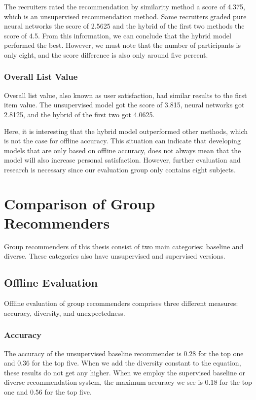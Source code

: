 The recruiters rated the recommendation by similarity method a score of 4.375, which is an unsupervised recommendation method. Same recruiters graded pure neural networks the score of 2.5625 and the hybrid of the first two methods the score of 4.5. From this information, we can conclude that the hybrid model performed the best. However, we must note that the number of participants is only eight, and the score difference is also only around five percent.

\subsubsection{Overall List Value}

Overall list value, also known as user satisfaction, had similar results to the first item value. The unsupervised model got the score of 3.815, neural networks got 2.8125, and the hybrid of the first two got 4.0625.

Here, it is interesting that the hybrid model outperformed other methods, which is not the case for offline accuracy. This situation can indicate that developing models that are only based on offline accuracy, does not always mean that the model will also increase personal satisfaction. However, further evaluation and research is necessary since our evaluation group only contains eight subjects.

\section{Comparison of Group Recommenders}

Group recommenders of this thesis consist of two main categories: baseline and diverse. These categories also have unsupervised and supervised versions.

\subsection{Offline Evaluation}

Offline evaluation of group recommenders comprises three different measures: accuracy, diversity, and unexpectedness.

\subsubsection{Accuracy}

The accuracy of the unsupervised baseline recommender is 0.28 for the top one and 0.36 for the top five. When we add the diversity constant to the equation, these results do not get any higher. When we employ the supervised baseline or diverse recommendation system, the maximum accuracy we see is 0.18 for the top one and 0.56 for the top five.

